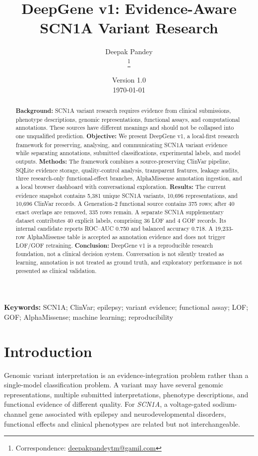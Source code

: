 \documentclass[12pt,a4paper]{article}
\title{\textbf{\fontsize{16}{19.2}\selectfont DeepGene v1: Evidence-Aware SCN1A Variant Research}}
\author{Deepak Pandey\\\thanks{Correspondence: \href{mailto:deepakpandeytm@gamil.com}{deepakpandeytm@gamil.com}}}
\date{Version 1.0\\\today}
\begin{document}
\maketitle

\begin{abstract}
\textbf{Background:} SCN1A variant research requires evidence from clinical submissions, phenotype descriptions, genomic representations, functional assays, and computational annotations. These sources have different meanings and should not be collapsed into one unqualified prediction. \textbf{Objective:} We present DeepGene v1, a local-first research framework for preserving, analysing, and communicating SCN1A variant evidence while separating annotations, submitted classifications, experimental labels, and model outputs. \textbf{Methods:} The framework combines a source-preserving ClinVar pipeline, SQLite evidence storage, quality-control analysis, transparent features, leakage audits, three research-only functional-effect branches, AlphaMissense annotation ingestion, and a local browser dashboard with conversational exploration. \textbf{Results:} The current evidence snapshot contains 5,381 unique SCN1A variants, 10,696 representations, and 10,696 ClinVar records. A Generation-2 functional source contains 375 rows; after 40 exact overlaps are removed, 335 rows remain. A separate SCN1A supplementary dataset contributes 40 explicit labels, comprising 36 LOF and 4 GOF records. Its internal candidate reports ROC--AUC 0.750 and balanced accuracy 0.718. A 19,233-row AlphaMissense table is accepted as annotation evidence and does not trigger LOF/GOF retraining. \textbf{Conclusion:} DeepGene v1 is a reproducible research foundation, not a clinical decision system. Conversation is not silently treated as learning, annotation is not treated as ground truth, and exploratory performance is not presented as clinical validation.
\end{abstract}

\textbf{Keywords:} SCN1A; ClinVar; epilepsy; variant evidence; functional assay; LOF; GOF; AlphaMissense; machine learning; reproducibility

\section{Introduction}
Genomic variant interpretation is an evidence-integration problem rather than a single-model classification problem. A variant may have several genomic representations, multiple submitted interpretations, phenotype descriptions, and functional evidence of different quality. For \emph{SCN1A}, a voltage-gated sodium-channel gene associated with epilepsy and neurodevelopmental disorders, functional effects and clinical phenotypes are related but not interchangeable.
\end{document}
